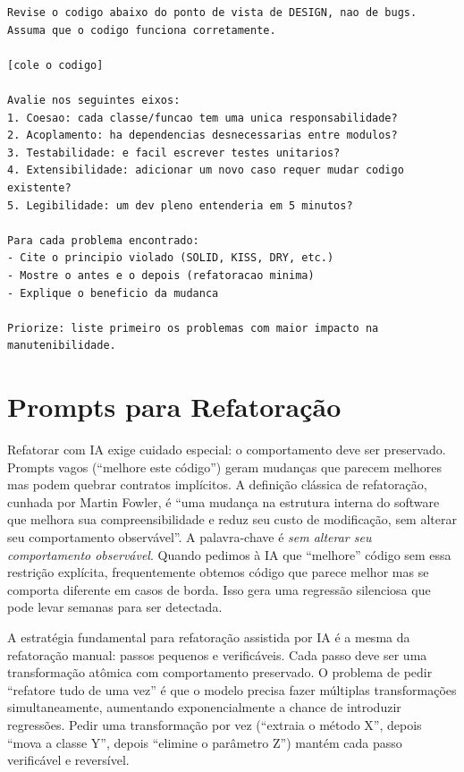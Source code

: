 \begin{lstlisting}[language={}, caption={Prompt para sugestões de melhoria de design}]
Revise o codigo abaixo do ponto de vista de DESIGN, nao de bugs.
Assuma que o codigo funciona corretamente.

[cole o codigo]

Avalie nos seguintes eixos:
1. Coesao: cada classe/funcao tem uma unica responsabilidade?
2. Acoplamento: ha dependencias desnecessarias entre modulos?
3. Testabilidade: e facil escrever testes unitarios?
4. Extensibilidade: adicionar um novo caso requer mudar codigo existente?
5. Legibilidade: um dev pleno entenderia em 5 minutos?

Para cada problema encontrado:
- Cite o principio violado (SOLID, KISS, DRY, etc.)
- Mostre o antes e o depois (refatoracao minima)
- Explique o beneficio da mudanca

Priorize: liste primeiro os problemas com maior impacto na
manutenibilidade.
\end{lstlisting}

\section{Prompts para Refatoração}

Refatorar com IA exige cuidado especial: o comportamento deve ser preservado.
Prompts vagos (``melhore este código'') geram mudanças que parecem melhores
mas podem quebrar contratos implícitos. A definição clássica de refatoração,
cunhada por Martin Fowler, é ``uma mudança na estrutura interna do software
que melhora sua compreensibilidade e reduz seu custo de modificação, sem alterar
seu comportamento observável''. A palavra-chave é \textit{sem alterar seu
comportamento observável}. Quando pedimos à IA que ``melhore'' código sem essa
restrição explícita, frequentemente obtemos código que parece melhor mas se
comporta diferente em casos de borda. Isso gera uma regressão silenciosa que pode levar
semanas para ser detectada.

A estratégia fundamental para refatoração assistida por IA é a mesma da
refatoração manual: passos pequenos e verificáveis. Cada passo deve ser uma
transformação atômica com comportamento preservado. O problema de pedir
``refatore tudo de uma vez'' é que o modelo precisa fazer múltiplas
transformações simultaneamente, aumentando exponencialmente a chance de
introduzir regressões. Pedir uma transformação por vez (``extraia o método
X'', depois ``mova a classe Y'', depois ``elimine o parâmetro Z'') mantém
cada passo verificável e reversível.

